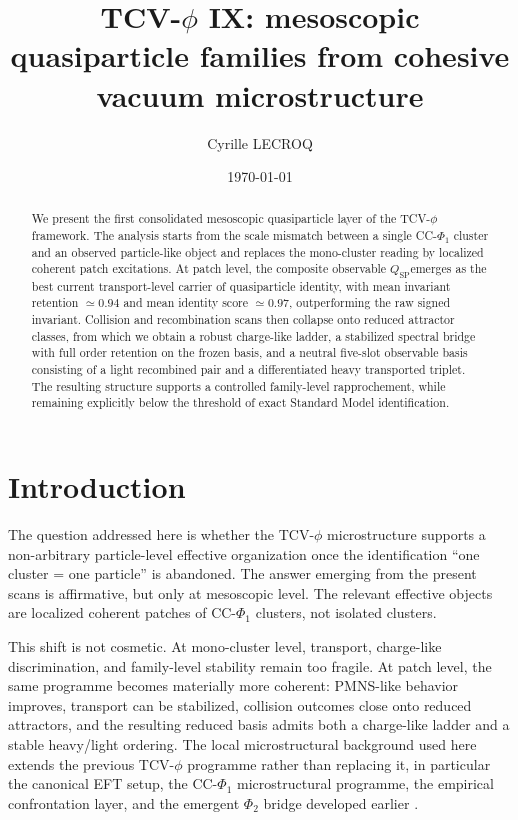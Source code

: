 \documentclass[aps,prd,onecolumn,nofootinbib,superscriptaddress]{revtex4-2}
\newcommand{\qsp}{\ensuremath{Q_{\mathrm{SP}}}}
\begin{document}
\title{TCV-\texorpdfstring{$\phi$}{phi} IX: mesoscopic quasiparticle families from cohesive vacuum microstructure}

\author{Cyrille LECROQ}

\date{\today}

\begin{abstract}
We present the first consolidated mesoscopic quasiparticle layer of the TCV-$\phi$ framework.
The analysis starts from the scale mismatch between a single CC-$\Phi_1$ cluster and an observed particle-like object and replaces the mono-cluster reading by localized coherent patch excitations.
At patch level, the composite observable \qsp emerges as the best current transport-level carrier of quasiparticle identity, with mean invariant retention $\simeq 0.94$ and mean identity score $\simeq 0.97$, outperforming the raw signed invariant.
Collision and recombination scans then collapse onto reduced attractor classes, from which we obtain a robust charge-like ladder, a stabilized spectral bridge with full order retention on the frozen basis, and a neutral five-slot observable basis consisting of a light recombined pair and a differentiated heavy transported triplet.
The resulting structure supports a controlled family-level rapprochement, while remaining explicitly below the threshold of exact Standard Model identification.
\end{abstract}

\maketitle

\section{Introduction}
The question addressed here is whether the TCV-$\phi$ microstructure supports a non-arbitrary particle-level effective organization once the identification ``one cluster = one particle'' is abandoned.
The answer emerging from the present scans is affirmative, but only at mesoscopic level.
The relevant effective objects are localized coherent patches of CC-$\Phi_1$ clusters, not isolated clusters.

This shift is not cosmetic.
At mono-cluster level, transport, charge-like discrimination, and family-level stability remain too fragile.
At patch level, the same programme becomes materially more coherent:
PMNS-like behavior improves, transport can be stabilized, collision outcomes close onto reduced attractors, and the resulting reduced basis admits both a charge-like ladder and a stable heavy/light ordering.
The local microstructural background used here extends the previous TCV-$\phi$ programme rather than replacing it, in particular the canonical EFT setup, the CC-$\Phi_1$ microstructural programme, the empirical confrontation layer, and the emergent $\Phi_2$ bridge developed earlier \cite{TCVPhiPaperI,TCVPhiPaperV,TCVPhiPaperVII,TCVPhiPaperVIII}.
\end{document}
